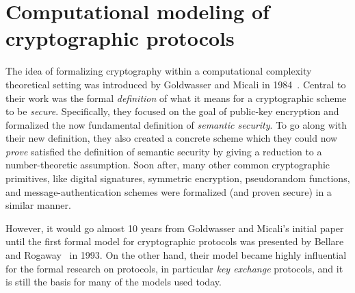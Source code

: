 \section[Computational modeling of cryptographic protocols]{Computational modeling of cryptographic protocols}

The idea of formalizing cryptography within a computational complexity theoretical setting was introduced by Goldwasser and Micali in 1984~\cite{GoldwasserM:1984:probabilistic_encryption}.
Central to their work was the formal \emph{definition} of what it means for a cryptographic scheme to be \emph{secure}.
Specifically,
they focused on the goal of public-key encryption and formalized the now fundamental definition of \emph{semantic security}.
To go along with their new definition,
they also created a concrete scheme which they could now \emph{prove} satisfied the definition of semantic security by giving a reduction to a number-theoretic assumption.
Soon after,
many other common cryptographic primitives,
like digital signatures,
symmetric encryption,
pseudorandom functions,
and
message-authentication schemes
were formalized (and proven secure) in a similar manner.

However,
it would go almost 10 years from Goldwasser and Micali's initial paper until the first formal model for cryptographic protocols was presented by Bellare and Rogaway~\cite{C:BelRog93} in 1993.
On the other hand,
their model became highly influential for the formal research on protocols,
in particular \emph{key exchange} protocols,
and it is still the basis for many of the models used today. 

%
%






